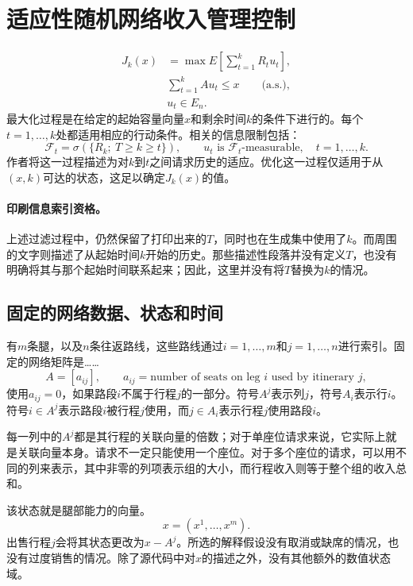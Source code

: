 \documentclass{article}
\begin{document}
\section*{适应性随机网络收入管理控制}

\begin{equation}
\begin{aligned}
J_k(x)&=\max E\left[\sum_{t=1}^{k}R_tu_t\right],\\
&\sum_{t=1}^{k}Au_t\leq x\qquad\text{(a.s.)},\\
&u_t\in E_n.
\end{aligned}\tag{6}
\end{equation}
最大化过程是在给定的起始容量向量$x$和剩余时间$k$的条件下进行的。每个$t=1,\ldots,k$处都适用相应的行动条件。相关的信息限制包括：
\[
\mathcal{F}_t=\sigma(\{R_k;\ T\geq k\geq t\}),
\qquad
u_t\text{ is }\mathcal{F}_t\text{-measurable},\quad t=1,\ldots,k.
\]
作者将这一过程描述为对$k$到$t$之间请求历史的适应。优化这一过程仅适用于从$(x,k)$可达的状态，这足以确定$J_k(x)$的值。

\paragraph{印刷信息索引资格。}
上述过滤过程中，仍然保留了打印出来的$T$，同时也在生成集中使用了$k$。而周围的文字则描述了从起始时间$k$开始的历史。那些描述性段落并没有定义$T$，也没有明确将其与那个起始时间联系起来；因此，这里并没有将$T$替换为$k$的情况。

\subsection*{固定的网络数据、状态和时间}
有$m$条腿，以及$n$条往返路线，这些路线通过$i=1,\ldots,m$和$j=1,\ldots,n$进行索引。固定的网络矩阵是……
\[
A=[a_{ij}],\qquad
 a_{ij}=\text{number of seats on leg }i\text{ used by itinerary }j,
\]
使用$a_{ij}=0$，如果路段$i$不属于行程$j$的一部分。符号$A^j$表示列$j$，符号$A_i$表示行$i$。符号$i\in A^j$表示路段$i$被行程$j$使用，而$j\in A_i$表示行程$j$使用路段$i$。

每一列中的$A^j$都是其行程的关联向量的倍数；对于单座位请求来说，它实际上就是关联向量本身。请求不一定只能使用一个座位。对于多个座位的请求，可以用不同的列来表示，其中非零的列项表示组的大小，而行程收入则等于整个组的收入总和。

该状态就是腿部能力的向量。
\[
x=(x^1,\ldots,x^m).
\]
出售行程$j$会将其状态更改为$x-A^j$。所选的解释假设没有取消或缺席的情况，也没有过度销售的情况。除了源代码中对$x$的描述之外，没有其他额外的数值状态域。
\end{document}
